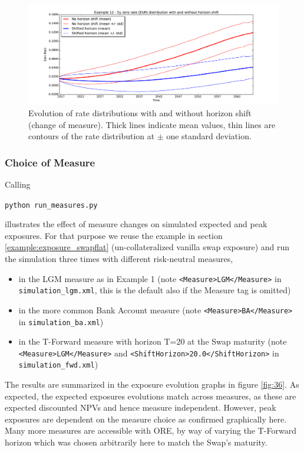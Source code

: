 \begin{figure}[h!]
\begin{center}
\includegraphics[scale=0.45]{examples/mpl_rates.pdf}
\end{center}
\caption{Evolution of rate distributions with and without horizon shift (change of measure). Thick lines indicate mean
  values, thin lines are contours of the rate distribution at $\pm$ one standard deviation.}
\label{fig_15b}
\end{figure}

\subsubsection{Choice of Measure}\label{example:exposure_measures}

Calling

\medskip
\centerline{\tt python run\_measures.py } 
\medskip

illustrates the effect of measure changes on simulated expected and peak exposures. For that purpose we reuse
the example in section \ref{example:exposure_swapflat} (un-collateralized vanilla swap exposure) and run the simulation
three times with different risk-neutral measures,
\begin{itemize}
\item in the LGM measure as in Example 1 (note {\tt <Measure>LGM</Measure>} in {\tt simulation\_lgm.xml}, this is the
  default also if the Measure tag is omitted)  
\item in the more common Bank Account measure (note {\tt <Measure>BA</Measure>} in {\tt simulation\_ba.xml})  
\item in the T-Forward measure with horizon T=20 at the Swap maturity (note {\tt <Measure>LGM</Measure>}  and
  {\tt <ShiftHorizon>20.0</ShiftHorizon>} in {\tt simulation\_fwd.xml})
\end{itemize}

The results are summarized in the exposure evolution graphs in figure \ref{fig:36}. As expected, the expected exposures
evolutions match across measures, as these are expected discounted NPVs and hence measure independent.
However, peak exposures are dependent on the measure choice as confirmed graphically here. Many more measures are
accessible with ORE, by way of varying the T-Forward horizon which was chosen arbitrarily here to match the Swap's maturity.

